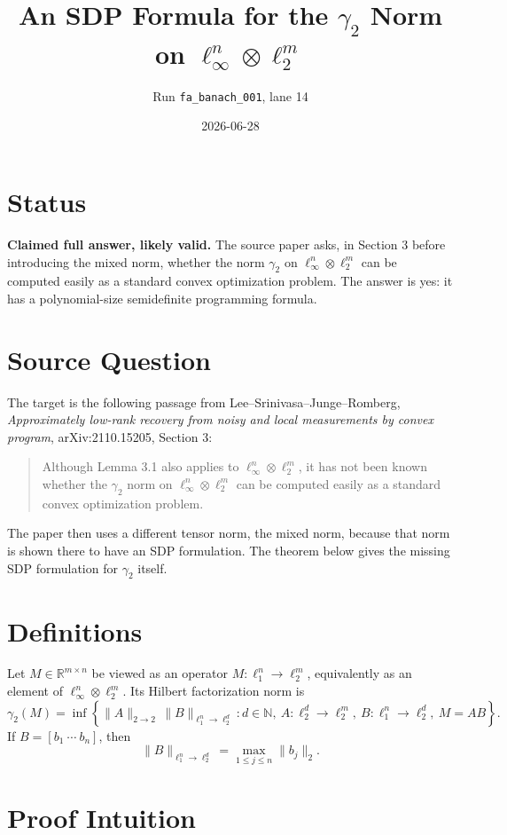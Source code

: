 \documentclass[11pt]{article}
\title{An SDP Formula for the \texorpdfstring{$\gamma_2$}{gamma2} Norm on
\texorpdfstring{$\ell_\infty^n\otimes \ell_2^m$}{ell-infinity tensor ell-2}}
\author{Run \texttt{fa\_banach\_001}, lane 14}
\date{2026-06-28}
\newcommand{\R}{\mathbb{R}}
\begin{document}
\maketitle

\section*{Status}

\textbf{Claimed full answer, likely valid.}
The source paper asks, in Section 3 before introducing the mixed norm, whether
the norm $\gamma_2$ on $\ell_\infty^n\otimes \ell_2^m$ can be computed easily as a
standard convex optimization problem.  The answer is yes: it has a polynomial-size
semidefinite programming formula.

\section*{Source Question}

The target is the following passage from Lee--Srinivasa--Junge--Romberg,
\emph{Approximately low-rank recovery from noisy and local measurements by convex
program}, arXiv:2110.15205, Section 3:
\begin{quote}
Although Lemma 3.1 also applies to $\ell_\infty^n\otimes \ell_2^m$, it has not
been known whether the $\gamma_2$ norm on $\ell_\infty^n\otimes \ell_2^m$ can be
computed easily as a standard convex optimization problem.
\end{quote}

The paper then uses a different tensor norm, the mixed norm, because that norm is
shown there to have an SDP formulation.  The theorem below gives the missing SDP
formulation for $\gamma_2$ itself.

\section*{Definitions}

Let $M\in\R^{m\times n}$ be viewed as an operator
$M:\ell_1^n\to\ell_2^m$, equivalently as an element of
$\ell_\infty^n\otimes \ell_2^m$.  Its Hilbert factorization norm is
\[
\gamma_2(M)=
\inf\left\{\|A\|_{2\to2}\,\|B\|_{\ell_1^n\to\ell_2^d}:
d\in\mathbb N,\ A:\ell_2^d\to\ell_2^m,\ B:\ell_1^n\to\ell_2^d,\ M=AB
\right\}.
\]
If $B=[b_1\ \cdots\ b_n]$, then
\[
\|B\|_{\ell_1^n\to\ell_2^d}=\max_{1\le j\le n}\|b_j\|_2.
\]

\section*{Proof Intuition}
\end{document}

